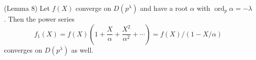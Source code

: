 (Lemma 8) Let $f(X)$ converge on $D(p^\lambda)$ and have a root $\alpha$ with $\operatorname{ord}_p \alpha = -\lambda$. Then the power series $$f_1(X) = f(X)\left(1 + \frac{X}{\alpha} + \frac{X^2}{\alpha^2} + \cdots\right) = f(X) / (1 - X/\alpha)$$ converges on $D(p^\lambda)$ as well.